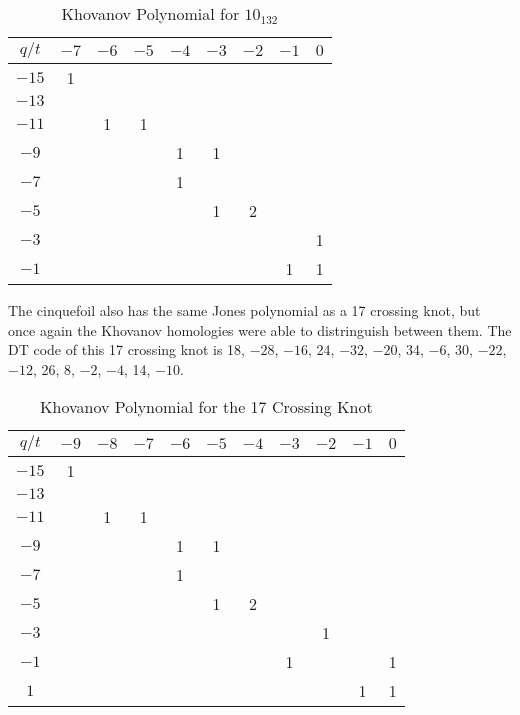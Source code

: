 \documentclass{article}
\theoremstyle{plain}
\begin{document}
        \begin{table}[H]
            \centering
            \begin{tabular}{| c | c | c | c | c | c | c | c | c |}
                \hline
                $q/t$&$-7$&$-6$&$-5$&$-4$&$-3$&$-2$&$-1$&$0$\\
                \hline
                $-15$&1&&&&&&&\\
                \hline
                $-13$&&&&&&&&\\
                \hline
                $-11$&&1&1&&&&&\\
                \hline
                $-9$&&&&1&1&&&\\
                \hline
                $-7$&&&&1&&&&\\
                \hline
                $-5$&&&&&1&2&&\\
                \hline
                $-3$&&&&&&&&1\\
                \hline
                $-1$&&&&&&&1&1\\
                \hline
            \end{tabular}
            \caption{Khovanov Polynomial for $10_{132}$}
        \end{table}
        The cinquefoil also has the same Jones polynomial as a 17 crossing knot,
        but once again the Khovanov homologies were able to distringuish
        between them. The DT code of this 17 crossing knot is
        18, $-28$, $-16$, 24, $-32$, $-20$, 34, $-6$, 30, $-22$, $-12$, 26,
        8, $-2$, $-4$, 14, $-10$.
        \begin{table}[H]
            \centering
            \begin{tabular}{| c | c | c | c | c | c | c | c | c | c | c |}
                \hline
                $q/t$&$-9$&$-8$&$-7$&$-6$&$-5$&$-4$&$-3$&$-2$&$-1$&$0$\\
                \hline
                $-15$&1&&&&&&&&&\\
                \hline
                $-13$&&&&&&&&&&\\
                \hline
                $-11$&&1&1&&&&&&&\\
                \hline
                $-9$&&&&1&1&&&&&\\
                \hline
                $-7$&&&&1&&&&&&\\
                \hline
                $-5$&&&&&1&2&&&&\\
                \hline
                $-3$&&&&&&&&1&&\\
                \hline
                $-1$&&&&&&&1&&&1\\
                \hline
                $1$&&&&&&&&&1&1\\
                \hline
            \end{tabular}
            \caption{Khovanov Polynomial for the 17 Crossing Knot}
        \end{table}
\end{document}
